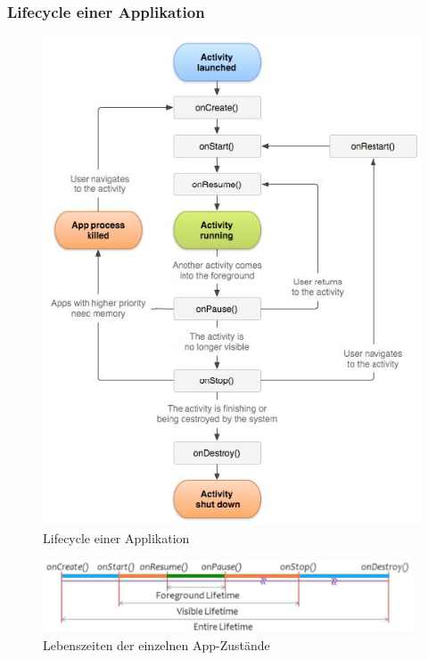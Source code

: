 \documentclass[a4paper]{article}
\begin{document}
	\subsubsection{Lifecycle einer Applikation}
	\begin{figure}[h!]
		\centering
		\includegraphics[width=13cm]{img/lifecycle.jpg}
		\caption{Lifecycle einer Applikation}
		\label{fig:lifecycle}
	\end{figure}
	\begin{figure}[h!]
		\centering
		\includegraphics[width=11cm]{img/lifetime.jpg}
		\caption{Lebenszeiten der einzelnen App-Zustände}
		\label{fig:lifetime}
	\end{figure}
	\newpage
\end{document}

